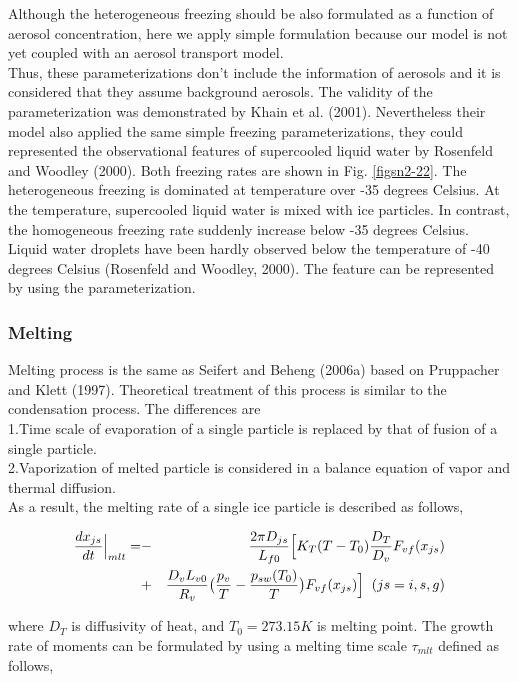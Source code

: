 Although the heterogeneous freezing should be also formulated as a function of aerosol concentration, here we apply simple formulation because our model is not yet coupled with an aerosol transport model.\\
Thus, these parameterizations don’t include the information of aerosols and it is considered that they assume background aerosols. The validity of the parameterization was demonstrated by Khain et al. (2001). Nevertheless their model also applied the same simple freezing parameterizations, they could represented the observational features of supercooled liquid water by Rosenfeld and Woodley (2000). Both freezing rates are shown in Fig. \ref{figsn2-22}. The heterogeneous freezing is dominated at temperature over -35 degrees Celsius. At the temperature, supercooled liquid water is mixed with ice particles. In contrast, the homogeneous freezing rate suddenly increase below -35 degrees Celsius. Liquid water droplets have been hardly observed below the temperature of -40 degrees Celsius (Rosenfeld and Woodley, 2000). The feature can be represented by using the parameterization.

\subsubsection{Melting}
Melting process is the same as Seifert and Beheng (2006a) based on Pruppacher and Klett (1997). Theoretical treatment of this process is similar to the condensation process. The differences are\\
1.Time scale of evaporation of a single particle is replaced by that of fusion of a single particle.\\
2.Vaporization of melted particle is considered in a balance equation of vapor and thermal diffusion.\\
As a result, the melting rate of a single ice particle is described as follows,

\begin{eqnarray}
\frac{dx_{js}}{dt}\Bigr|_{mlt}=&-&\frac{2\pi D_{js}}{L_{f0}}\Bigl[K_{T}(T-T_{0})\frac{D_{T}}{D_{v}}F_{vf}(x_{js})\nonumber\\
&+&\frac{D_{v}L_{v0}}{R_{v}}\bigr(\frac{p_{v}}{T}-\frac{p_{sw}(T_{0})}{T}\bigr)F_{vf}(x_{js})\Bigr]\;\;(js=i,s,g)\label{sn128}
\end{eqnarray}

where $D_{T}$ is diffusivity of heat, and $T_{0} = 273.15 K$ is melting point. The growth rate of moments can be formulated by using a melting time scale $\tau_{mlt}$ defined as follows,

